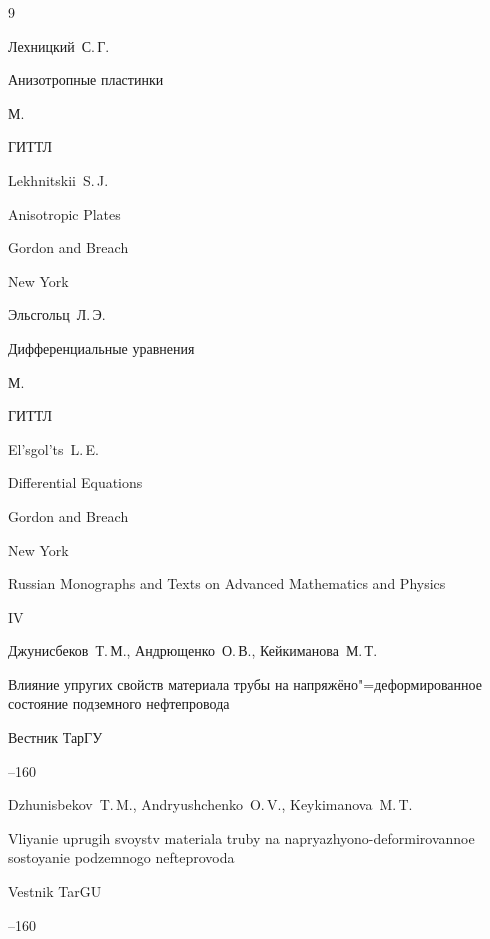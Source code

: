 \begin{thebibliography}{9}




\by Лехницкий~С.\,Г.

\book Анизотропные пластинки

\publaddr М.

\publ ГИТТЛ



\transl 

\by Lekhnitskii~S.\,J.

\book Anisotropic Plates

\publ Gordon and Breach

\publaddr New York 






\by Эльсгольц~Л.\,Э.

\book Дифференциальные уравнения

\publaddr М.

\publ ГИТТЛ



\transl

\by El'sgol'ts~L.\,E.

\book Differential Equations

\publ Gordon and Breach

\publaddr New York

\serial Russian Monographs and Texts on Advanced Mathematics and Physics

\vol IV








\by Джунисбеков~Т.\,М., Андрющенко~О.\,В., Кейкиманова~М.\,Т.

\paper Влияние упругих свойств материала трубы на напряжёно"=деформированное состояние подземного нефтепровода

\jour Вестник ТарГУ


--160

\misctransl 

\by Dzhunisbekov~T.\,M., Andryushchenko~O.\,V.,  Keykimanova~M.\,T.

\paper Vliyanie uprugih svoystv materiala truby na napryazhyono-deformiro\-vannoe sostoyanie podzemnogo nefteprovoda 

\jour Vestnik TarGU



--160



\end{thebibliography}





\makeengtitlem





\newpage



%

%

